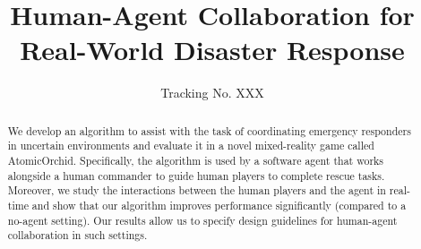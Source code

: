 \documentclass[letterpaper]{article}
\begin{document}
\setlength{\abovecaptionskip}{2pt}
\setlength{\belowcaptionskip}{-6pt}
\setlength{\abovedisplayskip}{0pt}
\setlength{\belowdisplayskip}{0pt}
\setlength{\floatsep}{0pt}
\setlength{\textfloatsep}{10pt}
%

\title{Human-Agent Collaboration for Real-World Disaster Response}
\author{Tracking No. XXX}

 \maketitle

\begin{abstract}
We develop an algorithm to assist with the task of coordinating emergency responders in uncertain environments and evaluate it in a novel mixed-reality game called AtomicOrchid. Specifically, the algorithm is used by a software  agent that works alongside a human commander to guide human players to complete rescue tasks. Moreover, we study the interactions between the human players and the agent in real-time and show that our algorithm improves  performance significantly (compared to a no-agent setting). Our results allow us to specify design guidelines for human-agent collaboration in such settings.
 \end{abstract}\vspace{-3mm}



\vspace{-2mm}


\vspace{-2mm}



\clearpage

\fontsize{9.5pt}{10.5pt}
{


}
\end{document}
